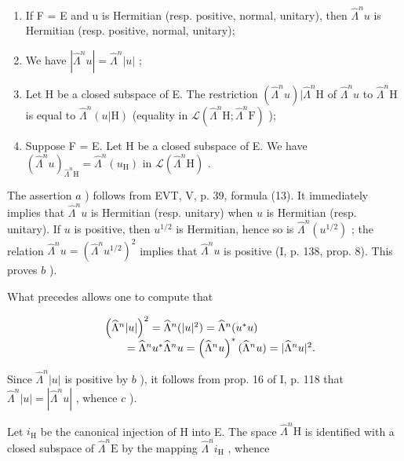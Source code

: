 \begin{enumerate}
\def\labelenumi{\alph{enumi})}
\setcounter{enumi}{1}
\item
  If F = E and u is Hermitian (resp. positive, normal, unitary), then \(\hat{\Lambda}^{n}u\) is Hermitian (resp. positive, normal, unitary);
\item
  We have \(|\widehat{\Lambda}^n u| = \widehat{\Lambda}^n |u|\) ;
\item
  Let H be a closed subspace of E. The restriction \((\widehat{\Lambda}^{n}u)|\widehat{\Lambda}^{n}\mathrm{H}\) of \(\widehat{\Lambda}^{n}u\) to \(\widehat{\Lambda}^{n}\mathrm{H}\) is equal to \(\widehat{\Lambda}^{n}(u|\mathrm{H})\) (equality in \(\mathcal{L}(\widehat{\Lambda}^{n}\mathrm{H};\widehat{\Lambda}^{n}\mathrm{F})\) );
\item
  Suppose F = E. Let H be a closed subspace of E. We have \((\hat{\Lambda}^{n}u)_{\hat{\Lambda}^{n}\mathrm{H}}=\hat{\Lambda}^{n}(u_{\mathrm{H}})\) in \(\mathcal{L}(\hat{\Lambda}^{n}\mathrm{H})\) .
\end{enumerate}

The assertion \(a\) ) follows from EVT, V, p. 39, formula (13). It immediately implies that \(\widehat{\Lambda}^{n}u\) is Hermitian (resp. unitary) when \(u\) is Hermitian (resp. unitary). If \(u\) is positive, then \(u^{1/2}\) is Hermitian, hence so is \(\widehat{\Lambda}^{n}(u^{1/2})\) ; the relation \(\widehat{\Lambda}^{n}u = (\widehat{\Lambda}^{n}u^{1/2})^{2}\) implies that \(\widehat{\Lambda}^{n}u\) is positive (I, p. 138, prop. 8). This proves \(b\) ).

What precedes allows one to compute that

\[
\begin{array}{r l} & {\left(\widehat {\Lambda} ^ {n} | u |\right) ^ {2} = \widehat {\Lambda} ^ {n} (| u | ^ {2}) = \widehat {\Lambda} ^ {n} (u ^ {*} u)} \\ & {\qquad = \widehat {\Lambda} ^ {n} u ^ {*} \widehat {\Lambda} ^ {n} u = \left(\widehat {\Lambda} ^ {n} u\right) ^ {*} (\widehat {\Lambda} ^ {n} u) = | \widehat {\Lambda} ^ {n} u | ^ {2}.} \end{array}
\]

Since \(\widehat{\Lambda}^n |u|\) is positive by \(b\) ), it follows from prop. 16 of I, p. 118 that \(\widehat{\Lambda}^n |u| = |\widehat{\Lambda}^n u|\) , whence \(c\) ).

Let \(i_{\mathrm{H}}\) be the canonical injection of H into E. The space \(\widehat{\Lambda}^{n}\mathrm{H}\) is identified with a closed subspace of \(\widehat{\Lambda}^{n}\mathrm{E}\) by the mapping \(\widehat{\Lambda}^{n}i_{\mathrm{H}}\) , whence

